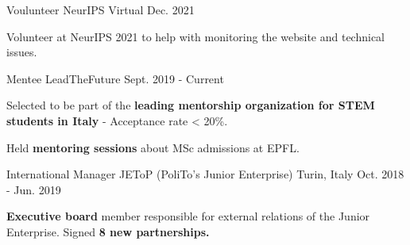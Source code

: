 

\begin{cventries}

\cventry
{Voulunteer} %
{NeurIPS} %
{Virtual} %
{Dec. 2021} %
{
    \begin{cvitems} %
        \item{Volunteer at NeurIPS 2021 to help with monitoring the website and technical issues.}
    \end{cvitems}
}

\cventry
{Mentee} %
{LeadTheFuture} %
{} %
{Sept. 2019 - Current} %
{
    \begin{cvitems} %
        \item{Selected to be part of the \textbf{leading mentorship organization for STEM students in Italy} - Acceptance rate < 20\%.}
        \item{Held \textbf{mentoring sessions} about MSc admissions at EPFL.}
    \end{cvitems}
}

\cventry
{International Manager} %
{JEToP (PoliTo's Junior Enterprise)} %
{Turin, Italy} %
{Oct. 2018 - Jun. 2019} %
{
    \begin{cvitems} %
        \item{\textbf{Executive board} member responsible for external relations of the Junior Enterprise. Signed \textbf{8 new partnerships.}}
    \end{cvitems}
}
\end{cventries}
